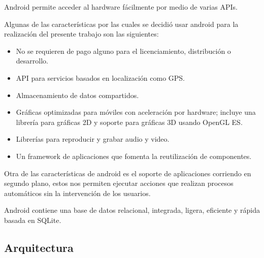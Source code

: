 \documentclass[12pt,a4paper,spanish,openany]{book}
\begin{document}
Android permite acceder al hardware fácilmente por medio de varias APIs.

\newpage
Algunas de las características por las cuales se decidió usar android para la
realización del presente trabajo son las siguientes:
\begin{itemize}
  \item No se requieren de pago alguno para el licenciamiento, distribución o
  desarrollo.
  \item API para servicios basados en localización como GPS.
  \item Almacenamiento de datos compartidos.
  \item Gráficas optimizadas para móviles con aceleración por hardware; incluye
  una librería para gráficas 2D y soporte para gráficas 3D usando OpenGL ES.
  \item Librerías para reproducir y grabar audio y video.
  \item Un framework de aplicaciones que fomenta la reutilización de
  componentes.
\end{itemize}

Otra de las características de android es el soporte de aplicaciones corriendo
en segundo plano, estos nos permiten ejecutar acciones que realizan procesos
automáticos sin la intervención de los usuarios.

Android contiene una base de datos relacional, integrada, ligera, eficiente y
rápida basada en SQLite. 

\subsection{Arquitectura}
\end{document}
